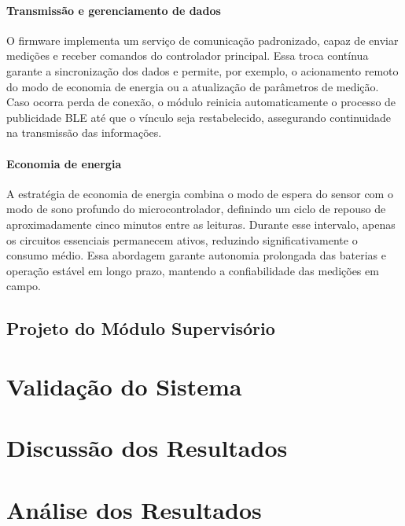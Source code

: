 \subsubsection{Transmissão e gerenciamento de dados}
O firmware implementa um serviço de comunicação padronizado, capaz de enviar medições e receber comandos do controlador principal. Essa troca contínua garante a sincronização dos dados e permite, por exemplo, o acionamento remoto do modo de economia de energia ou a atualização de parâmetros de medição. Caso ocorra perda de conexão, o módulo reinicia automaticamente o processo de publicidade \gls{BLE} até que o vínculo seja restabelecido, assegurando continuidade na transmissão das informações.

\subsubsection{Economia de energia}
A estratégia de economia de energia combina o modo de espera do sensor com o modo de sono profundo do microcontrolador, definindo um ciclo de repouso de aproximadamente cinco minutos entre as leituras. Durante esse intervalo, apenas os circuitos essenciais permanecem ativos, reduzindo significativamente o consumo médio. Essa abordagem garante autonomia prolongada das baterias e operação estável em longo prazo, mantendo a confiabilidade das medições em campo.


\section{Projeto do Módulo Supervisório}




\chapter{Validação do Sistema}


\chapter{Discussão dos Resultados}


\chapter{Análise dos Resultados}

